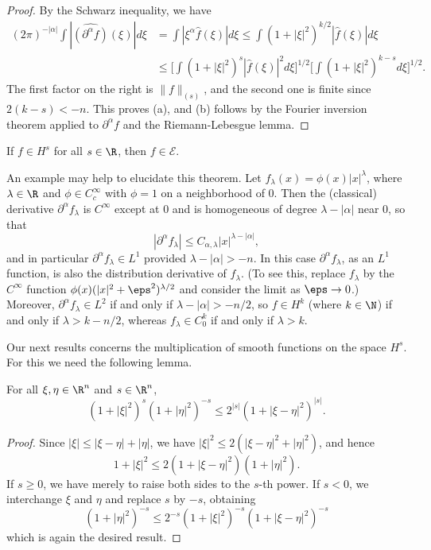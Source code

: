 \begin{proof}
By the Schwarz inequality, we have
\begin{align*}
(2\pi)^{-|\alpha|}\int|\widehat{(\partial^\alpha f)}(\xi)|d\xi&=\int|\xi^\alpha\hat{f}(\xi)|d\xi\leq\int(1+|\xi|^2)^{k/2}|\hat{f}(\xi)|d\xi\\
&\leq\Big[\int(1+|\xi|^2)^s|\hat{f}(\xi)|^2d\xi\Big]^{1/2}\Big[\int(1+|\xi|^2)^{k-s}d\xi\big]^{1/2}.
\end{align*}
The first factor on the right is $\|f\|_{(s)}$, and the second one is finite since $2(k-s)<-n$. This proves (a), and (b) follows by the Fourier inversion theorem applied to $\partial^\alpha f$ and the Riemann-Lebesgue lemma.
\end{proof}
\begin{corollary}\label{Sobolev intersection is smooth}
If $f\in H^s$ for all $s\in\R$, then $f\in\mathscr{E}$.
\end{corollary}
\begin{example}
An example may help to elucidate this theorem. Let $f_\lambda(x)=\phi(x)|x|^\lambda$, where $\lambda\in\R$ and $\phi\in C_c^\infty$ with $\phi=1$ on a neighborhood of $0$. Then the (classical) derivative $\partial^\alpha f_\lambda$ is $C^\infty$ except at $0$ and is homogeneous of degree $\lambda-|\alpha|$ near $0$, so that 
\[|\partial^\alpha f_\lambda|\leq C_{\alpha,\lambda}|x|^{\lambda-|\alpha|},\]
and in particular $\partial^\alpha f_\lambda\in L^1$ provided $\lambda-|\alpha|>-n$. In this case $\partial^\alpha f_\lambda$, as an $L^1$ function, is also the distribution derivative of $f_\lambda$. (To see this, replace $f_\lambda$ by the $C^\infty$ function $\phi(x)(|x|^2+\eps^2)^{\lambda/2}$ and consider the limit as $\eps\to 0$.) Moreover, $\partial^\alpha f_\lambda\in L^2$ if and only if $\lambda-|\alpha|>-n/2$, so $f\in H^k$ (where $k\in\N$) if and only if $\lambda>k-n/2$, whereas $f_\lambda\in C_0^k$ if and only if $\lambda>k$.
\end{example}
Our next results concerns the multiplication of smooth functions on the space $H^s$. For this we need the following lemma.
\begin{lemma}\label{Sobolev space multiplication lemma}
For all $\xi,\eta\in\R^n$ and $s\in\R^n$,
\[(1+|\xi|^2)^s(1+|\eta|^2)^{-s}\leq 2^{|s|}(1+|\xi-\eta|^2)^{|s|}.\]
\end{lemma}
\begin{proof}
Since $|\xi|\leq|\xi-\eta|+|\eta|$, we have $|\xi|^2\leq 2(|\xi-\eta|^2+|\eta|^2)$, and hence
\[1+|\xi|^2\leq 2(1+|\xi-\eta|^2)(1+|\eta|^2).\]
If $s\geq 0$, we have merely to raise both sides to the $s$-th power. If $s<0$, we interchange $\xi$ and $\eta$ and replace $s$ by $-s$, obtaining
\[(1+|\eta|^2)^{-s}\leq 2^{-s}(1+|\xi|^2)^{-s}(1+|\xi-\eta|^2)^{-s}\]
which is again the desired result.
\end{proof}
